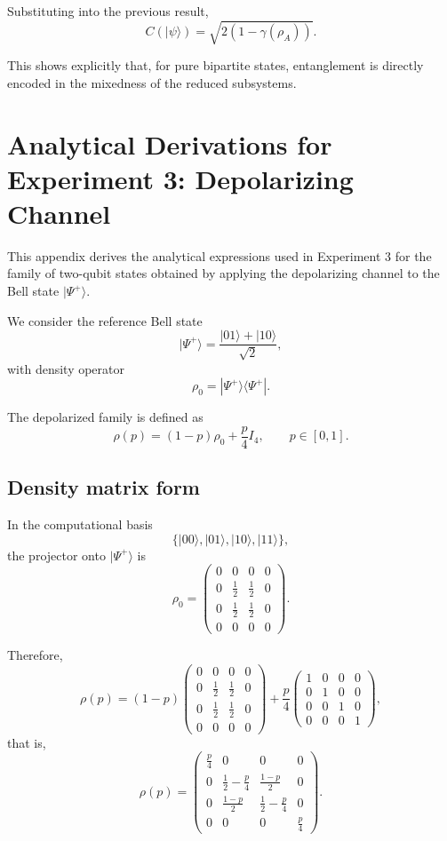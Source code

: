 \documentclass[a4paper]{article}
\begin{document}
Substituting into the previous result,
\[
C(|\psi\rangle)
=
\sqrt{2\left(1 - \gamma(\rho_A)\right)}.
\]

This shows explicitly that, for pure bipartite states, entanglement is directly encoded in the mixedness of the reduced subsystems.
\section{Analytical Derivations for Experiment 3: Depolarizing Channel}

This appendix derives the analytical expressions used in Experiment 3 for the family of two-qubit states obtained by applying the depolarizing channel to the Bell state \(|\Psi^+\rangle\).

We consider the reference Bell state
\[
|\Psi^+\rangle = \frac{|01\rangle + |10\rangle}{\sqrt{2}},
\]
with density operator
\[
\rho_0 = |\Psi^+\rangle\langle\Psi^+|.
\]

The depolarized family is defined as
\[
\rho(p) = (1-p)\rho_0 + \frac{p}{4}I_4,
\qquad p \in [0,1].
\]

\subsection*{Density matrix form}

In the computational basis
\[
\{|00\rangle, |01\rangle, |10\rangle, |11\rangle\},
\]
the projector onto \(|\Psi^+\rangle\) is
\[
\rho_0
=
\begin{pmatrix}
0 & 0 & 0 & 0\\
0 & \frac12 & \frac12 & 0\\
0 & \frac12 & \frac12 & 0\\
0 & 0 & 0 & 0
\end{pmatrix}.
\]

Therefore,
\[
\rho(p)
=
(1-p)
\begin{pmatrix}
0 & 0 & 0 & 0\\
0 & \frac12 & \frac12 & 0\\
0 & \frac12 & \frac12 & 0\\
0 & 0 & 0 & 0
\end{pmatrix}
+
\frac{p}{4}
\begin{pmatrix}
1 & 0 & 0 & 0\\
0 & 1 & 0 & 0\\
0 & 0 & 1 & 0\\
0 & 0 & 0 & 1
\end{pmatrix},
\]
that is,
\[
\rho(p)
=
\begin{pmatrix}
\frac p4 & 0 & 0 & 0\\
0 & \frac12-\frac p4 & \frac{1-p}{2} & 0\\
0 & \frac{1-p}{2} & \frac12-\frac p4 & 0\\
0 & 0 & 0 & \frac p4
\end{pmatrix}.
\]
\end{document}
